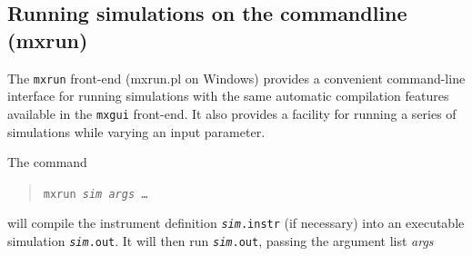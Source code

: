 \subsection{Running simulations on the commandline (mxrun)}
\label{s:mxrun}

The \verb+mxrun+ front-end (mxrun.pl on Windows) provides a convenient command-line
interface for running simulations with the same automatic compilation
features available in the \verb+mxgui+ front-end. It also provides a
facility for running a series of simulations while varying an input
parameter.

The command
\begin{quote}
  \texttt{mxrun {\it sim} {\it args\/} \ldots}
\end{quote}
will compile the instrument definition \texttt{{\it sim}.instr} (if
necessary) into an executable simulation \texttt{{\it sim}.out}. It
will then run \texttt{{\it sim}.out}, passing the argument list {\it
  args}

